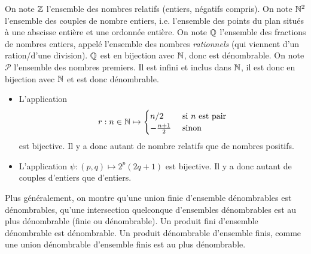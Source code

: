 \documentclass{cours}
\begin{document}
    \begin{definition}
        On note $\mathbb{Z}$ l'ensemble des nombres relatifs (entiers, négatifs compris). On note $\mathbb{N}^{2}$ l'ensemble des couples de nombre entiers, i.e. l'ensemble des points du plan situés à une abscisse entière et une ordonnée entière. On note $\mathbb{Q}$ l'ensemble des fractions de nombres entiers, appelé l'ensemble des nombres \emph{rationnels} (qui viennent d'un ration/d'une division). $\mathbb{Q}$ est en bijection avec $\mathbb{N}$, donc est dénombrable. On note $\mathcal{P}$ l'ensemble des nombres premiers. Il est infini et inclus dans $\mathbb{N}$, il est donc en bijection avec $\mathbb{N}$ et est donc dénombrable.
    \end{definition}

    \begin{proposition}
        \begin{itemize}
            \item L'application \[
                r : n \in \mathbb{N} \mapsto \begin{cases} n/2 & \text{ si } n \text{ est pair}\\ -\frac{n+1}{2} & \text{ sinon}
                \end{cases}
                    \]
                est bijective. Il y a donc autant de nombre relatifs que de nombres positifs.
            \item L'application $\psi : (p, q) \mapsto 2^{p}(2q + 1)$ est bijective. Il y a donc autant de couples d'entiers que d'entiers.
        \end{itemize}
    \end{proposition}

    \begin{remark}
        Plus généralement, on montre qu'une union finie d'ensemble dénombrables est dénombrables, qu'une intersection quelconque d'ensembles dénombrables est au plus dénombrable (finie ou dénombrable). Un produit fini d'ensemble dénombrable est dénombrable. Un produit dénombrable d'ensemble finis, comme une union dénombrable d'ensemble finis est au plus dénombrable. 
    \end{remark}
\end{document}
